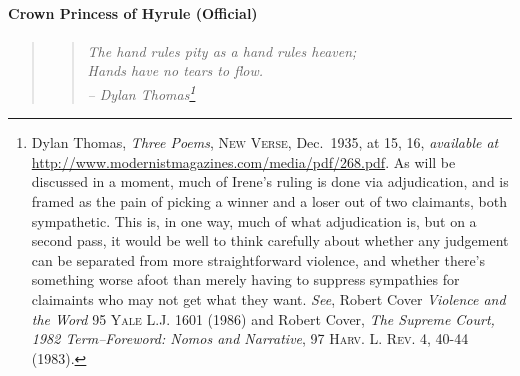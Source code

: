   \paragraph{Crown Princess of Hyrule (Official)}\label{sec:machiavelli}
      \begin{quote}
      \begin{verse}\begingroup\it 
      The hand rules pity as a hand rules heaven;\\
      Hands have no tears to flow.\endgroup\\
      \hfill -- Dylan Thomas\footnote{Dylan Thomas, \textit{Three Poems}, \textsc{New Verse}, Dec.~1935, at 15, 16, \textit{available at} \url{http://www.modernistmagazines.com/media/pdf/268.pdf}. As will be discussed in a moment, much of Irene's ruling is done via adjudication, and is framed as the pain of picking a winner and a loser out of two claimants, both sympathetic. This is, in one way, much of what adjudication is, but on a second pass, it would be well to think carefully about whether any judgement can be separated from more straightforward violence, and whether there's something worse afoot than merely having to suppress sympathies for claimaints who may not get what they want. \textit{See}, Robert Cover \textit{Violence and the Word} \textsc{95 Yale L.J. 1601} (1986) and Robert Cover, \textit{The Supreme Court, 1982 Term--Foreword: Nomos and Narrative}, 97 \textsc{Harv. L. Rev.} 4, 40-44 (1983).}
      \end{verse}
      \end{quote}
